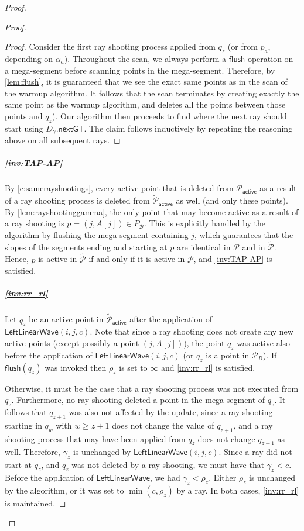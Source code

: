 \documentclass[a4paper,UKenglish,cleveref, autoref, thm-restate]{lipics-v2021}
\newcommand{\LLW}{\mathsf{LeftLinearWave}}
\newcommand{\local}{\text{short }}
\newcommand{\longrange}{\text{long }}
\newcommand{\nextGT}{\mathsf{nextGT}}
\renewcommand{\P}{\mathcal{P}}
\newcommand{\AP}{\P_{\mathsf{active}}}
\newcommand{\TAP}{\tilde{\P}_{\mathsf{active}}}
\newcommand{\DGAM}{D_{\gamma}}
\newcommand{\TP}{\tilde{\P}}
\newcommand{\para}[1]{\vspace{-0.1in} \subparagraph*{#1}}
\newcommand{\B}{\mathcal{B}}
\newcommand{\rl}[1]{\rho_{#1}}
\newcommand{\flush}{\mathsf{flush}}
\begin{document}
\begin{proof}
\begin{proof}
\begin{proof}
Consider the first \longrange ray shooting process applied from $q_z$ (or from $p_a$, depending on $\alpha_a$).
Throughout the scan, we always perform a $\flush$ operation on a mega-segment before scanning points in the mega-segment.
Therefore, by \cref{lem:flush}, it is guaranteed that we see the exact same points as in the scan of the warmup algorithm.
It follows that the scan terminates by creating exactly the same point as the warmup algorithm, and deletes all the points between those points and $q_z$).
Our algorithm then proceeds to find where the  next  \longrange ray  should start using $\DGAM.\nextGT$.
The claim follows inductively by repeating the reasoning above on all subsequent \longrange rays.
\end{proof}

\para{\cref{inv:TAP-AP}}

By \cref{c:samerayshootings}, every active point that is deleted from $\AP$ as a result of a ray shooting process is deleted from $\TAP$ as well (and only these points).
By \cref{lem:rayshootinggamma}, the only point that may become active as a result of a ray shooting is $p=(j,A[j]) \in P_{\B}$. This is explicitly handled by the algorithm by flushing the mega-segment containing $j$, which guarantees that the slopes of the segments ending and starting at $p$ are identical in $\P$ and in $\TP$. Hence, $p$ is active in $\TP$ if and only if it is active in $\P$, and \cref{inv:TAP-AP} is satisfied.

\para{\cref{inv:rr_rl}}
Let $q_z$ be an active point in $\TAP$ after the application of $\LLW(i,j,c)$.
Note that since a ray shooting does not create any new active points (except possibly a point $(j,A[j])$), the point $q_z$ was  active also before the application of $\LLW(i,j,c)$ (or $q_z$ is a point in $\P_{B}$).
If $\flush(q_z)$ was invoked then $\rl{z}$ is set to $\infty$ and \cref{inv:rr_rl} is satisfied. 

Otherwise, 
    it must be the case that a \longrange ray shooting process was not executed from $q_z$. 
    Furthermore, no \longrange ray shooting deleted a point in the mega-segment of $q_z$.
    It follows that $q_{z+1}$ was also not affected by the update, since a ray shooting starting in $q_w$ with $w \ge z+1$ does not change the value of $q_{z+1}$, and a \local ray shooting process that may have been applied from $q_z$ does not change $q_{z+1}$ as well.
    Therefore, $\gamma_z$ is unchanged by $\LLW(i,j,c)$.
    Since a \longrange ray did not start at $q_z$, and $q_z$ was not deleted by a \longrange ray shooting, we must have that $\gamma_z <c$.
    Before the application of $\LLW$, we had $\gamma_z < \rl{z}$. Either
    $\rl{z}$ is unchanged by the algorithm, or it was set to $\min(c,\rl{z})$ by a \local ray.
    In both cases, \cref{inv:rr_rl} is maintained.


\end{proof}
\end{proof}
\end{document}

